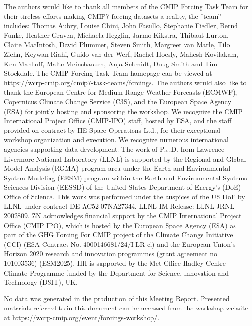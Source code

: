 \documentclass{ametsocV6.1}
\begin{document}
\clearpage
\acknowledgments
The authors would like to thank all members of the CMIP Forcing Task Team for their tireless efforts making CMIP7 forcing datasets a reality, the ``team'' includes: Thomas Aubry, Louise Chini, John Fasullo, Stephanie Fiedler, Bernd Funke, Heather Graven, Michaela Hegglin, Jarmo Kikstra, Thibaut Lurton, Claire MacIntosh, David Plummer, Steven Smith, Margreet van Marle, Tilo Ziehn, Keywan Riahi, Guido van der Werf, Rachel Hoesly, Mahesh Kovilakam, Ken Mankoff, Malte Meinshausen, Anja Schmidt, Doug Smith and Tim Stockdale. The CMIP Forcing Task Team homepage can be viewed at \url{https://wcrp-cmip.org/cmip7-task-teams/forcings}. The authors would also like to thank the European Centre for Medium-Range Weather Forecasts (ECMWF), Copernicus Climate Change Service (C3S), and the European Space Agency (ESA) for jointly hosting and sponsoring the workshop. We recognize the CMIP International Project Office (CMIP-IPO) staff, hosted by ESA, and the staff provided on contract by HE Space Operations Ltd., for their exceptional workshop organization and execution. We recognize numerous international agencies supporting data development. The work of P.J.D. from Lawrence Livermore National Laboratory (LLNL) is supported by the Regional and Global Model Analysis (RGMA) program area under the Earth and Environmental System Modeling (EESM) program within the Earth and Environmental Systems Sciences Division (EESSD) of the United States Department of Energy’s (DoE) Office of Science. This work was performed under the auspices of the US DoE by LLNL under contract DE-AC52-07NA27344. LLNL IM Release: LLNL-JRNL-2002809. ZN acknowledges financial support by the CMIP International Project Office (CMIP IPO), which is hosted by the European Space Agency (ESA) as part of the GHG Forcing For CMIP project of the Climate Change Initiative (CCI) (ESA Contract No. 4000146681/24/I-LR-cl) and the European Union's Horizon 2020 research and innovation programmes (grant agreement no. 101003536) (ESM2025). HH is supported by the Met Office Hadley Centre Climate Programme funded by the Department for Science, Innovation and Technology (DSIT), UK.


\datastatement
No data was generated in the production of this Meeting Report. Presented materials referred to in this document can be accessed from the workshop website at \url{https://wcrp-cmip.org/event/forcings-workshop/}.




\end{document}

